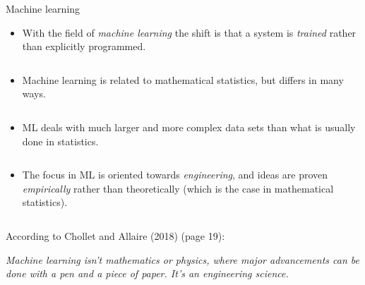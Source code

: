\documentclass[
  10pt,
  ignorenonframetext,
]{beamer}
\providecommand{\tightlist}{%
  \setlength{\itemsep}{0pt}\setlength{\parskip}{0pt}}
\begin{document}
\begin{frame}
\begin{block}{Machine learning}
\protect\hypertarget{machine-learning}{}
\(~\)

\begin{itemize}
\tightlist
\item
  With the field of \emph{machine learning} the shift is that a system
  is \emph{trained} rather than explicitly programmed.
\end{itemize}

\(~\)

\begin{itemize}
\tightlist
\item
  Machine learning is related to mathematical statistics, but differs in
  many ways.
\end{itemize}

\(~\)

\begin{itemize}
\tightlist
\item
  ML deals with much larger and more complex data sets than what is
  usually done in statistics.
\end{itemize}

\(~\)

\begin{itemize}
\tightlist
\item
  The focus in ML is oriented towards \emph{engineering}, and ideas are
  proven \emph{empirically} rather than theoretically (which is the case
  in mathematical statistics).
\end{itemize}

\(~\)

According to Chollet and Allaire (2018) (page 19): \vspace{2mm}

\emph{Machine learning isn't mathematics or physics, where major
advancements can be done with a pen and a piece of paper. It's an
engineering science.}
\end{block}
\end{frame}
\end{document}
